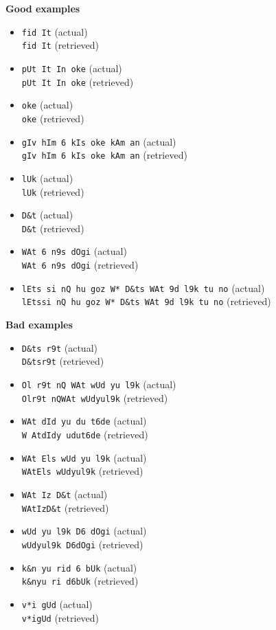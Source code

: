 \begin{multicols}{2}
\noindent\textbf{Good examples}

\begin{itemize}
\item \texttt{fid It} (actual)\\ \texttt{fid It} (retrieved)
\item \texttt{pUt It In oke} (actual)\\ \texttt{pUt It In oke} (retrieved)
\item \texttt{oke} (actual)\\ \texttt{oke} (retrieved)
\item \texttt{gIv hIm 6 kIs oke kAm an} (actual)\\ \texttt{gIv hIm 6 kIs oke kAm an} (retrieved)
\item \texttt{lUk} (actual)\\ \texttt{lUk} (retrieved)
\item \texttt{D\&t} (actual)\\ \texttt{D\&t} (retrieved)
\item \texttt{WAt 6 n9s dOgi} (actual)\\ \texttt{WAt 6 n9s dOgi} (retrieved)
\item \texttt{lEts si nQ hu goz W* D\&ts WAt 9d l9k tu no} (actual)\\ \texttt{lEtssi nQ hu goz W* D\&ts WAt 9d l9k tu no} (retrieved)
\end{itemize}
\vfill
\columnbreak
\noindent\textbf{Bad examples}

\begin{itemize}
\item \texttt{D\&ts r9t} (actual)\\ \texttt{D\&tsr9t} (retrieved)
\item \texttt{Ol r9t nQ WAt wUd yu l9k} (actual)\\ \texttt{Olr9t nQWAt wUdyul9k} (retrieved)
\item \texttt{WAt dId yu du t6de} (actual)\\ \texttt{W AtdIdy udut6de} (retrieved)
\item \texttt{WAt Els wUd yu l9k} (actual)\\ \texttt{WAtEls wUdyul9k} (retrieved)
\item \texttt{WAt Iz D\&t} (actual)\\ \texttt{WAtIzD\&t} (retrieved)
\item \texttt{wUd yu l9k D6 dOgi} (actual)\\ \texttt{wUdyul9k D6dOgi} (retrieved)
\item \texttt{k\&n yu rid 6 bUk} (actual)\\ \texttt{k\&nyu ri d6bUk} (retrieved)
\item \texttt{v*i gUd} (actual)\\ \texttt{v*igUd} (retrieved)
\end{itemize}

\end{multicols}

